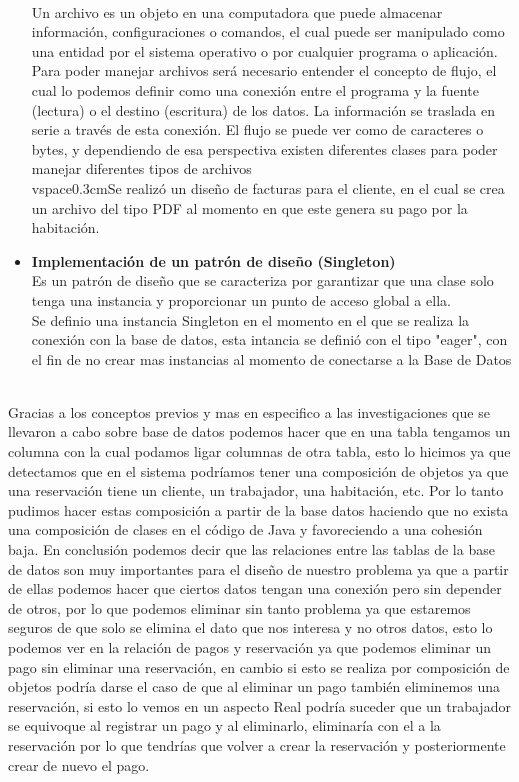 \documentclass[a4paper,12pt]{article}
\begin{document}
\begin{flushleft}
\begin{itemize}
\textsf{\\Un archivo es un objeto en una computadora que puede almacenar información, configuraciones o comandos, el cual puede ser manipulado como una entidad por el sistema operativo o por cualquier programa o aplicación. \\\vspace{0.3cm}Para poder manejar archivos será necesario entender el concepto de flujo, el cual lo podemos definir como una conexión entre el programa y la fuente (lectura) o el destino (escritura) de los datos. La información se traslada en serie a través de esta conexión. El flujo se puede ver como de caracteres o bytes, y dependiendo de esa perspectiva existen diferentes clases para poder manejar diferentes tipos de archivos\\vspace{0.3cm}Se realizó un diseño de facturas para el cliente, en el cual se crea un archivo del tipo PDF al momento en que este genera su pago por la habitación.}
\item{\textbf{Implementación de un patrón de diseño (Singleton)}}
\vspace{0.3cm}
\textsf{\\Es un patrón de diseño que se caracteriza por garantizar que una clase solo tenga una instancia y proporcionar un punto de acceso global a ella.\\\vspace{0.3cm}Se definio una instancia Singleton en el momento en el que se realiza la conexión con la base de datos, esta intancia se definió con el tipo "eager", con el fin de no crear mas instancias al momento de conectarse a la Base de Datos}
\end{itemize}

\textsf{\\Gracias a los conceptos previos y mas en especifico a las investigaciones que se llevaron a cabo sobre base de datos podemos hacer que en una tabla tengamos un columna  con la cual podamos ligar columnas de otra tabla, esto lo hicimos ya que detectamos que en el sistema podríamos tener una composición de objetos ya que una reservación tiene un cliente, un trabajador, una habitación, etc. Por lo tanto pudimos hacer estas composición  a partir de la base datos haciendo que no exista una composición de clases en el código de Java y favoreciendo a una cohesión baja. En conclusión podemos decir que las relaciones entre las tablas de la base de datos son muy importantes para el diseño de nuestro problema ya que a partir de ellas podemos hacer que ciertos datos tengan una conexión pero sin depender de otros, por lo que podemos eliminar  sin tanto problema ya que estaremos seguros de que solo se elimina el dato que nos interesa y no otros datos, esto lo podemos ver en la relación de pagos y reservación ya que podemos eliminar un pago sin eliminar una reservación, en cambio si esto se realiza por composición de objetos podría darse el caso de que al eliminar un pago también eliminemos una reservación,  si esto lo vemos en un aspecto Real podría suceder que un trabajador se equivoque al registrar un pago y al eliminarlo, eliminaría con el a la reservación por lo que tendrías que volver a crear la reservación y posteriormente crear de nuevo el pago.}


\end{flushleft}
\end{document}
